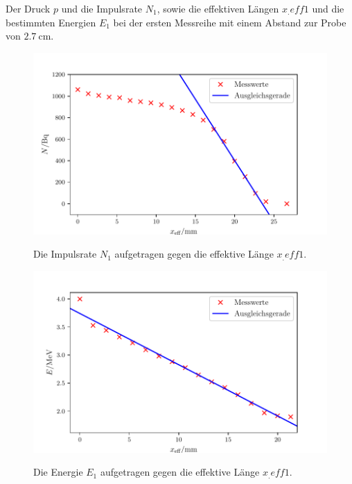\begin{table}
	\centering
	\caption{Der Druck $p$ und die Impulsrate $N_1$, sowie die effektiven Längen $x_.{eff1}$ und die bestimmten Energien $E_1$ bei der ersten Messreihe mit einem Abstand zur Probe von $\SI{2.7}{\centi\metre}$.}
	
	\label{tab:1}
\end{table}
\begin{figure}
	\centering
	\caption{Die Impulsrate $N_1$ aufgetragen gegen die effektive Länge $x_.{eff1}$.}
	\includegraphics[width=\linewidth-70pt,height=\textheight-70pt,keepaspectratio]{content/images/Graph1N.pdf}
	\label{fig:1N}
\end{figure}
\begin{figure}
	\centering
	\caption{Die Energie $E_1$ aufgetragen gegen die effektive Länge $x_.{eff1}$.}
	\includegraphics[width=\linewidth-70pt,height=\textheight-70pt,keepaspectratio]{content/images/Graph1E.pdf}
	\label{fig:1E}
\end{figure}


